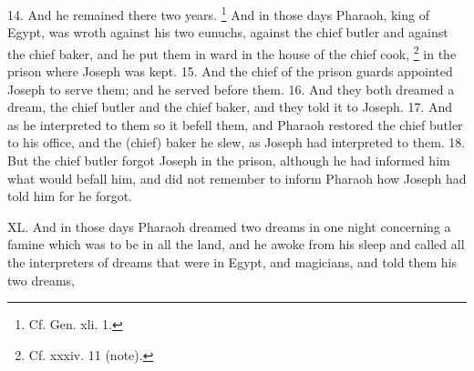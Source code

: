 14. And he remained there two years. \footnote{Cf. Gen. xli. 1.} And in those days Pharaoh, king of Egypt, was wroth against his two eunuchs, against the chief butler and against the chief baker, and he put them in ward in the house of the chief cook, \footnote{Cf. xxxiv. 11 (note).} in the prison where Joseph was kept. 15. And the chief of the prison guards appointed Joseph to serve them; and he served before them. 16. And they both dreamed a dream, the chief butler and the chief baker, and they told it to Joseph. 17. And as he interpreted to them so it befell them, and Pharaoh restored the chief butler to his office, and the (chief) baker he slew, as Joseph had interpreted to them. 18. But the chief butler forgot Joseph in the prison, although he had informed him what would befall him, and did not remember to inform Pharaoh how Joseph had told him for he forgot.


XL. And in those days Pharaoh dreamed two dreams in one night concerning a famine which was to be in all the land, and he awoke from his sleep and called all the interpreters of dreams that were in Egypt, and magicians, and told them his two dreams,

